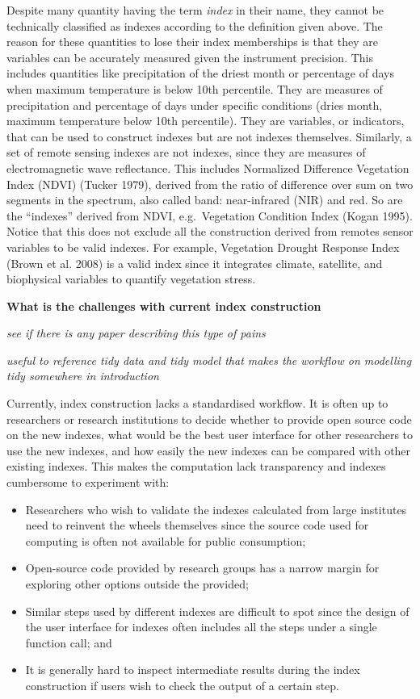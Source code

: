\documentclass[
  letterpaper,
  DIV=11,
  numbers=noendperiod]{scrartcl}
\providecommand{\tightlist}{%
  \setlength{\itemsep}{0pt}\setlength{\parskip}{0pt}}\usepackage{longtable,booktabs,array}
\begin{document}
Despite many quantity having the term \emph{index} in their name, they
cannot be technically classified as indexes according to the definition
given above. The reason for these quantities to lose their index
memberships is that they are variables can be accurately measured given
the instrument precision. This includes quantities like precipitation of
the driest month or percentage of days when maximum temperature is below
10th percentile. They are measures of precipitation and percentage of
days under specific conditions (dries month, maximum temperature below
10th percentile). They are variables, or indicators, that can be used to
construct indexes but are not indexes themselves. Similarly, a set of
remote sensing indexes are not indexes, since they are measures of
electromagnetic wave reflectance. This includes Normalized Difference
Vegetation Index (NDVI) (Tucker 1979), derived from the ratio of
difference over sum on two segments in the spectrum, also called band:
near-infrared (NIR) and red. So are the ``indexes'' derived from NDVI,
e.g.~Vegetation Condition Index (Kogan 1995). Notice that this does not
exclude all the construction derived from remotes sensor variables to be
valid indexes. For example, Vegetation Drought Response Index (Brown et
al. 2008) is a valid index since it integrates climate, satellite, and
biophysical variables to quantify vegetation stress.

\textbf{What is the challenges with current index construction}

\emph{see if there is any paper describing this type of pains}

\emph{useful to reference tidy data and tidy model that makes the
workflow on modelling tidy somewhere in introduction}

Currently, index construction lacks a standardised workflow. It is often
up to researchers or research institutions to decide whether to provide
open source code on the new indexes, what would be the best user
interface for other researchers to use the new indexes, and how easily
the new indexes can be compared with other existing indexes. This makes
the computation lack transparency and indexes cumbersome to experiment
with:

\begin{itemize}
\tightlist
\item
  Researchers who wish to validate the indexes calculated from large
  institutes need to reinvent the wheels themselves since the source
  code used for computing is often not available for public consumption;
\item
  Open-source code provided by research groups has a narrow margin for
  exploring other options outside the provided;
\item
  Similar steps used by different indexes are difficult to spot since
  the design of the user interface for indexes often includes all the
  steps under a single function call; and
\item
  It is generally hard to inspect intermediate results during the index
  construction if users wish to check the output of a certain step.
\end{itemize}
\end{document}
